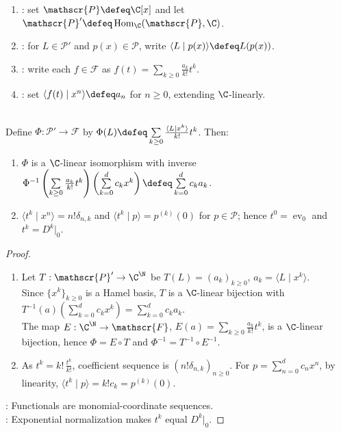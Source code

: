 \begin{definition} \label{def:umbral-algebra-functional-identification} 
\begin{enumerate}[label=(\roman*)]
\setlength{\itemsep}{0pt}
\item {}: set $\mathscr{P}\defeq\C[x]$ and let $\mathscr{P}'\defeq\operatorname{Hom}_{\C}(\mathscr{P},\C)$.
\item {}: for $L\in\mathscr{P}'$ and $p(x)\in\mathscr{P}$, write $\langle L\mid p(x)\rangle\defeq L(p(x))$.
\item {}: write each $f\in\mathscr{F}$ as $f(t)=\sum\limits_{k\geq0}\frac{a_k}{k!}t^k$.
\item {}: set $\langle f(t)\mid x^n\rangle\defeq a_n$ for $n\geq0$, extending $\C$-linearly.
\end{enumerate}
\end{definition}

\begin{theorem} \label{thm:umbral-functional-series-isomorphism} \\
Define $\Phi:\mathscr{P}'\to\mathscr{F}$ by $\Phi(L)\defeq\sum\limits_{k\geq0}\frac{\langle L\mid x^k\rangle}{k!}t^k$. Then:
\begin{enumerate}[label=(\roman*)]
\setlength{\itemsep}{0pt}
\item $\Phi$ is a $\C$-linear isomorphism with inverse $\Phi^{-1}\left(\sum\limits_{k\geq0}\frac{a_k}{k!}t^k\right)\left(\sum\limits_{k=0}^{d}c_kx^k\right)\defeq\sum\limits_{k=0}^{d}c_ka_k$.
\item $\langle t^k\mid x^n\rangle=n!\delta_{n,k}$ and $\langle t^k\mid p\rangle=p^{(k)}(0)$ for $p\in\mathscr{P}$; hence $t^0=\operatorname{ev}_0$ and $t^k=D^k|_0$.
\end{enumerate}
\begin{proof}
\begin{enumerate}[label=(\roman*)]
\setlength{\itemsep}{0pt}
\item Let $T:\mathscr{P}'\to\C^{\N}$ be $T(L)=(a_k)_{k\geq0}$, $a_k=\langle L\mid x^k\rangle$.\\
Since $\{x^k\}_{k\geq0}$ is a Hamel basis, $T$ is a $\C$-linear bijection with $T^{-1}(a)\left(\sum\limits_{k=0}^{d}c_kx^k\right)=\sum\limits_{k=0}^{d}c_ka_k$.\\
The map $E:\C^{\N}\to\mathscr{F}$, $E(a)=\sum\limits_{k\geq0}\frac{a_k}{k!}t^k$, is a $\C$-linear bijection, hence $\Phi=E\circ T$ and $\Phi^{-1}=T^{-1}\circ E^{-1}$.
\item As $t^k=k!\,\frac{t^k}{k!}$, coefficient sequence is $(n!\delta_{n,k})_{n\geq0}$. For $p=\sum\limits_{n=0}^{d}c_nx^n$, by linearity, $\langle t^k\mid p\rangle=k!c_k=p^{(k)}(0)$.
\end{enumerate}
: Functionals are monomial-coordinate sequences.\\
: Exponential normalization makes $t^k$ equal $D^k|_0$.
\end{proof}
\end{theorem}

